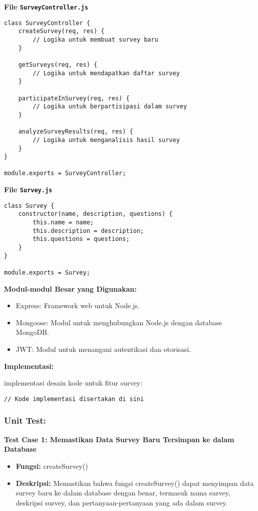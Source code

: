\documentclass[12pt]{article}
\begin{document}
\textbf{File \texttt{SurveyController.js}}

\begin{verbatim}
class SurveyController {
    createSurvey(req, res) {
        // Logika untuk membuat survey baru
    }

    getSurveys(req, res) {
        // Logika untuk mendapatkan daftar survey
    }

    participateInSurvey(req, res) {
        // Logika untuk berpartisipasi dalam survey
    }

    analyzeSurveyResults(req, res) {
        // Logika untuk menganalisis hasil survey
    }
}

module.exports = SurveyController;
\end{verbatim}

\textbf{File \texttt{Survey.js}}

\begin{verbatim}
class Survey {
    constructor(name, description, questions) {
        this.name = name;
        this.description = description;
        this.questions = questions;
    }
}

module.exports = Survey;
\end{verbatim}

\textbf{Modul-modul Besar yang Digunakan:}

\begin{itemize}
    \item Express: Framework web untuk Node.js.
    \item Mongoose: Modul untuk menghubungkan Node.js dengan database MongoDB.
    \item JWT: Modul untuk menangani autentikasi dan otorisasi.
\end{itemize}

\textbf{Implementasi:}

implementasi desain kode untuk fitur survey:

\begin{verbatim}
// Kode implementasi disertakan di sini
\end{verbatim}

\subsubsection*{Unit Test:}

\textbf{Test Case 1: Memastikan Data Survey Baru Tersimpan ke dalam Database}

\begin{itemize}
    \item \textbf{Fungsi:} createSurvey()
    \item \textbf{Deskripsi:} Memastikan bahwa fungsi createSurvey() dapat menyimpan data survey baru ke dalam database dengan benar, termasuk nama survey, deskripsi survey, dan pertanyaan-pertanyaan yang ada dalam survey.
\end{itemize}
\end{document}
